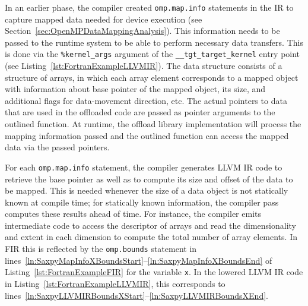 \documentclass[acmtog,natbib=false]{acmart}
\newcommand{\code}[1]{\texttt{#1}\xspace}
\begin{document}

In an earlier phase, the compiler created \code{omp.map.info} statements in the \ac{IR} to capture mapped data needed for device execution (see Section~\ref{sec:OpenMPDataMappingAnalysis}).
This information needs to be passed to the runtime system to be able to perform necessary data transfers.
This is done via the \code{\%kernel\_args} argument of the \code{\_\_tgt\_target\_kernel} entry point (see Listing~\ref{lst:FortranExampleLLVMIR}).
The data structure consists of a structure of arrays, in which each array element corresponds to a mapped object with information about base pointer of the mapped object, its size, and additional flags for data-movement direction, etc.
The actual pointers to data that are used in the offloaded code are passed as pointer arguments to the outlined function.
At runtime, the offload library implementation will process the mapping information passed and the outlined function can access the mapped data via the passed pointers.



For each \code{omp.map.info} statement, the compiler generates LLVM \ac{IR} code to retrieve the base pointer as well as to compute its size and offset of the data to be mapped.
This is needed whenever the size of a data object is not statically known at compile time; for statically known information, the compiler pass computes these results ahead of time.
For instance, the compiler emits intermediate code to access the descriptor of arrays and read the dimensionality and extent in each dimension to compute the total number of array elements.
In \ac{FIR} this is reflected by the \code{omp.bounds} statement in lines~\ref{ln:SaxpyMapInfoXBoundsStart}--\ref{ln:SaxpyMapInfoXBoundsEnd} of Listing~\ref{lst:FortranExampleFIR} for the variable \code{x}.
In the lowered LLVM \ac{IR} code in Listing~\ref{lst:FortranExampleLLVMIR}, this corresponds to lines~\ref{ln:SaxpyLLVMIRBoundsXStart}--\ref{ln:SaxpyLLVMIRBoundsXEnd}.
\end{document}
